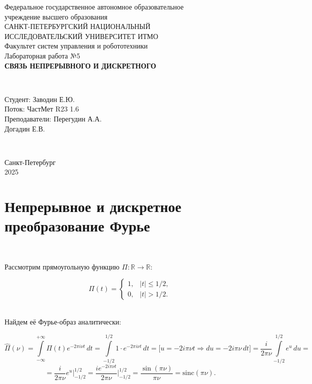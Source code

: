 \documentclass[a4paper]{article}
\let\oldint\int
\def\int{\oldint\limits}
\begin{document}
\begin{titlepage}
    \begin{center}
        Федеральное государственное автономное образовательное \\ учреждение высшего образования \\[6pt]
        САНКТ-ПЕТЕРБУРГСКИЙ НАЦИОНАЛЬНЫЙ \\ ИССЛЕДОВАТЕЛЬСКИЙ УНИВЕРСИТЕТ ИТМО \\[16pt]
        Факультет систем управления и робототехники \\[26em]
        Лабораторная работа №5 \\[0.5em]
        \textbf{СВЯЗЬ НЕПРЕРЫВНОГО И ДИСКРЕТНОГО}
    \end{center}\,\\[10em]
    \begin{flushright}
        Студент: Заводин Е.Ю.\\
        Поток: ЧастМет R23 1.6 \\[0.5em]
        Преподаватели: Перегудин А.А.\\
        Догадин Е.В.
    \end{flushright}\,\\[6em]
    \begin{center}
        {\small Санкт-Петербург \\ 2025}
    \end{center}
\end{titlepage}
\setcounter{page}{2}
\tableofcontents\newpage

\section{Непрерывное и дискретное преобразование Фурье}\

Рассмотрим прямоугольную функцию $\Pi : \mathbb{R} \to \mathbb{R} :$

$$
\Pi(t) = \begin{cases}
    1, & \left| t \right| \leq 1/2, \\
    0, & \left| t \right| > 1/2.
\end{cases}
$$\

Найдем её Фурье-образ аналитически:

$$
\hat{\Pi}(\nu) = \int_{-\infty}^{+\infty} \Pi(t) e^{-2\pi i \nu t}\, dt = \int_{-1/2}^{1/2} 1 \cdot e^{-2\pi i \nu t} \, dt = \Bigg [ u = -2i\pi \nu t \Rightarrow du = -2i \pi \nu \, dt \Bigg ] = \frac{i}{2\pi \nu} \int_{-1/2}^{1/2} e^u \, du =$$
$$= \frac{i}{2\pi \nu} e^u \Bigg |^{1/2}_{-1/2} =\frac{i e^{-2i\pi \nu t}}{2\pi \nu} \Bigg |^{1/2}_{-1/2} = \frac{\sin{(\pi \nu)}}{\pi\nu} = \mathrm{sinc} (\pi\nu).
$$\ 
\end{document}
